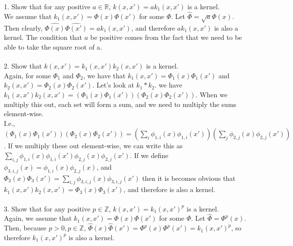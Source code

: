 \documentclass[12pt,letterpaper,boxed]{hmcpset}
\begin{document}
\begin{solution}
1. Show that for any positive $a \in \mathbb{R}$, $k(x,x') = ak_1(x,x')$ is a kernel. \\ 
We assume that $k_1(x,x') = \Phi(x)\Phi(x')$ for some $\Phi$. Let $\hat{\Phi} = \sqrt{a}\Phi(x)$. Then clearly, $\hat{\Phi(x)}\hat{\Phi(x')} = ak_1(x,x')$, and therefore $ak_1(x,x')$ is also a kernel. The condition that $a$ be positive comes from the fact that we need to be able to take the square root of a. \\ \\ 
2. Show that $k(x,x') = k_1(x,x')k_2(x,x')$ is a kernel. \\ 
Again, for some $\Phi_1$ and $\Phi_2$,  we have that $k_1(x,x')=\Phi_1(x)\Phi_1(x')$ and $k_2(x,x')=\Phi_2(x)\Phi_2(x')$. Let's look at $k_1*k_2$. we have $k_1(x,x')k_2(x,x') = (\Phi_1(x)\Phi_1(x'))(\Phi_2(x)\Phi_2(x'))$. When we multiply this out, each set will form a sum, and we need to multiply the sums element-wise.\\ I.e., $(\Phi_1(x)\Phi_1(x'))(\Phi_2(x)\Phi_2(x')) = (\sum\limits_i \phi_{1,i}(x)\phi_{1,i}(x'))(\sum\limits_j \phi_{2,j}(x)\phi_{2,j}(x'))$. If we multiply these out element-wise, we can write this as $\sum\limits_{i,j} \phi_{1,i}(x)\phi_{1,i}(x')\phi_{2,j}(x)\phi_{2,j}(x')$. If we define $\phi_{3,i,j}(x) = \phi_{1,i}(x)\phi_{2,j}(x)$, and $\Phi_3(x)\Phi_3(x') = \sum \limits_{i,j} \phi_{3,i,j}(x)\phi_{3,i,j}(x')$ then it is becomes obvious that $k_1(x,x')k_2(x,x') = \Phi_3(x)\Phi_3(x')$, and therefore is also a kernel.  \\ \\
3. Show that for any positive $p \in \mathbb{Z}$, $k(x,x') = k_1(x,x')^p$ is a kernel. \\ 
Again, we assume that $k_1(x,x') = \Phi(x)\Phi(x')$ for some $\Phi$. Let $\hat{\Phi} = \Phi^p(x)$. Then, because $p>0, p\in\mathbb{Z}$, $\hat{\Phi}(x)\hat{\Phi}(x') =  \Phi^p(x)\Phi^p(x') =  k_1(x,x')^p$, so therefore $ k_1(x,x')^p$ is also a kernel. \\ \\ 

\end{solution}
\end{document}
